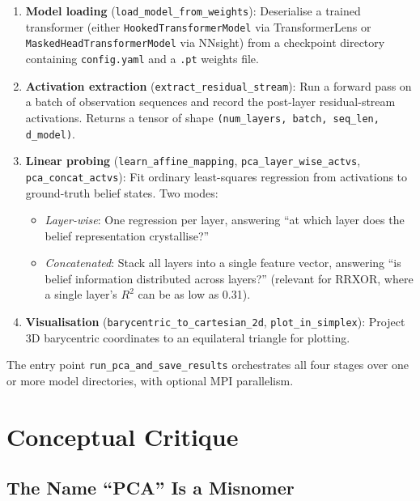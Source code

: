 \documentclass[11pt]{article}
\newcommand{\code}[1]{\texttt{#1}}
\newcommand{\file}[1]{\texttt{#1}}
\begin{document}
\begin{enumerate}
  \item \textbf{Model loading} (\code{load\_model\_from\_weights}): Deserialise a trained transformer (either \code{HookedTransformerModel} via TransformerLens or \code{MaskedHeadTransformerModel} via NNsight) from a checkpoint directory containing \file{config.yaml} and a \file{.pt} weights file.

  \item \textbf{Activation extraction} (\code{extract\_residual\_stream}): Run a forward pass on a batch of observation sequences and record the post-layer residual-stream activations.  Returns a tensor of shape \code{(num\_layers, batch, seq\_len, d\_model)}.

  \item \textbf{Linear probing} (\code{learn\_affine\_mapping}, \code{pca\_layer\_wise\_actvs}, \code{pca\_concat\_actvs}): Fit ordinary least-squares regression from activations to ground-truth belief states.  Two modes:
  \begin{itemize}
    \item \emph{Layer-wise}: One regression per layer, answering ``at which layer does the belief representation crystallise?''
    \item \emph{Concatenated}: Stack all layers into a single feature vector, answering ``is belief information distributed across layers?'' (relevant for RRXOR, where a single layer's $R^2$ can be as low as 0.31).
  \end{itemize}

  \item \textbf{Visualisation} (\code{barycentric\_to\_cartesian\_2d}, \code{plot\_in\_simplex}): Project 3D barycentric coordinates to an equilateral triangle for plotting.
\end{enumerate}

The entry point \code{run\_pca\_and\_save\_results} orchestrates all four stages over one or more model directories, with optional MPI parallelism.

\section{Conceptual Critique}

\subsection{The Name ``PCA'' Is a Misnomer}\label{sec:misnomer}
\end{document}
